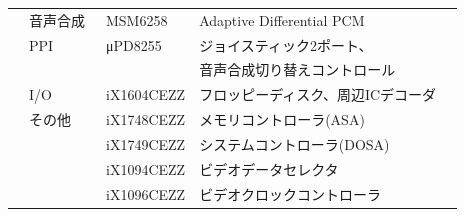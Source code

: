 \documentclass[twoside,a4paper,12pt]{article}
\begin{document}
\begin{tabular}{|p{13mm}|p{25mm}|p{22mm}|p{73mm}|p{30mm}|}
& 音声合成 & \ MSM6258 & Adaptive Differential PCM &\\
& PPI & \ μPD8255 & ジョイスティック2ポート、 &\\
& & & 音声合成切り替えコントロール &\\
& I/O & \ iX1604CEZZ & フロッピーディスク、周辺ICデコーダ &\\
& その他 & \ iX1748CEZZ & メモリコントローラ(ASA) &\\
& & \ iX1749CEZZ & システムコントローラ(DOSA) &\\
& & \ iX1094CEZZ & ビデオデータセレクタ &\\
& & \ iX1096CEZZ & ビデオクロックコントローラ &\\
\hline
\end{tabular}

\newpage
\end{document}
